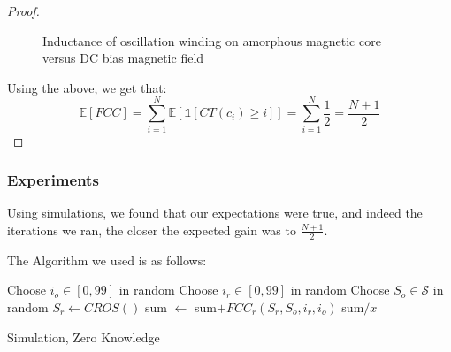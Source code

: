 \documentclass[a4paper,10pt]{article}
\newcommand\rob{\ensuremath{r}\xspace}
\newcommand\opp{\ensuremath{o}\xspace}
\newcommand{\fcc}{\ensuremath{FCC}\xspace}
\newcommand{\cros}{\ensuremath{CROS}\xspace}
\begin{document}
\begin{proof}
\begin{figure}[thpb]
      \caption{Inductance of oscillation winding on amorphous
       magnetic core versus DC bias magnetic field}
      \label{figurelabel}
   \end{figure}
  
Using the above, we get that:
\[\mathbb{E}[\fcc]=\sum_{i=1}^{N}{\mathbb{E}\left[\mathds{1}\left[CT\left(c_i\right)\geq i\right]\right]}=\sum_{i=1}^{N}{\frac{1}{2}}=\frac{N+1}{2}\]
\end{proof}

\subsubsection{Experiments}\label{subsubsections:ZeroKnowledgeExpreiments}
Using simulations, we found that our expectations were true, and indeed the iterations we ran, the closer the expected gain was to $\frac{N+1}{2}$.

The Algorithm we used is as follows:

\begin{algorithm}
\begin{algorithmic}
    	\STATE Choose $i_{\opp} \in \left[0,99\right]$ in random
        \STATE Choose $i_{\rob} \in \left[0,99\right]$ in random
        \STATE Choose $S_{\opp} \in \mathcal{S}$ in random
        \STATE $S_{\rob} \leftarrow \cros\left(\right)$
    	\STATE sum $\leftarrow $ sum$+ {\fcc}_{\rob}(S_{\rob},S_{\opp}, i_{\rob}, i_{\opp})$
    \ENDFOR
    \RETURN sum$/x$
  
\end{algorithmic}
\caption{Simulation, Zero Knowledge\label{algorithms:zero knowledge, simulations}}
\end{algorithm}
\end{document}
